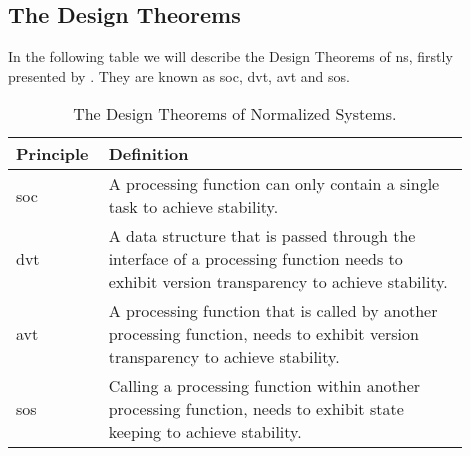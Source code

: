 \subsection{The Design Theorems} \label{subsec_ns_desing_theorems}

In the following table we will describe the Design Theorems of \gls{ns}, firstly presented
by \textcite[111-119]{mannaert_normalized_2009}. They are known as \gls{soc}, \gls{dvt},
\gls{avt} and \gls{sos}.

\begin{table}[H]
    \begin{tabular}{ p{0.15\linewidth} p{0.75\linewidth}}
        \hline
        \textbf{Principle} & \textbf{Definition} \\ 
        \hline
        \acrshort*{soc} & A processing function can only contain a single task to achieve
        stability. \\
        
        \acrshort{dvt} &  A data structure that is passed through the interface of a processing function needs to
        exhibit version transparency to achieve stability.\\
        
        \acrshort{avt} & A processing function that is called by another processing function, needs to exhibit version
        transparency to achieve stability.\\
        
        \acrshort{sos} & Calling a processing function within another processing function, needs to exhibit state
        keeping to achieve stability.\\
        
        \bottomrule
    \end{tabular}
    \caption{The Design Theorems of Normalized Systems.}
    \label{ns_principles}
\end{table}